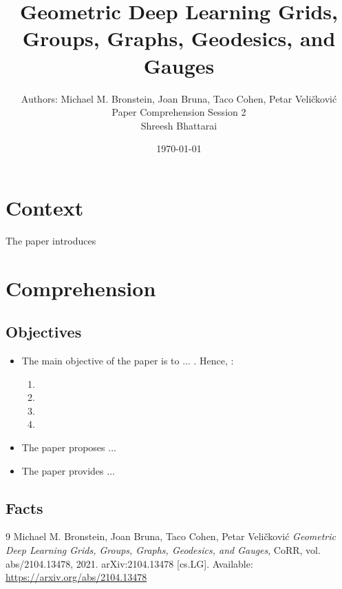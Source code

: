 \documentclass[11pt, a4paper]{article}
\title{Geometric Deep Learning Grids, Groups, Graphs, Geodesics, and Gauges}
\author{Authors: Michael M. Bronstein, Joan Bruna, Taco Cohen, Petar Veličković\\Paper Comprehension Session 2\\Shreesh Bhattarai}
\date{\today}
\theoremstyle{plain} %
\theoremstyle{definition} %
\begin{document}
	
	\maketitle
	
	\section{Context}
	\label{sec:context}
		The paper introduces 



	\section{Comprehension}
	\label{sec:comprehension}
		\subsection{Objectives}
		\label{sec:objectives}
			\begin{itemize}
				\item The main objective of the paper is to ... . Hence, :
				\begin{enumerate}
					\item
					\item
					\item
					\item
				\end{enumerate}
				\item The paper proposes ...
				\item The paper provides ...
			\end{itemize}


		\subsection{Facts}
		\label{sec:facts}
			
			
			
			
			
			
			
			
			
			
			

	\begin{thebibliography}{9}
		Michael M. Bronstein, Joan Bruna, Taco Cohen, Petar Veličković
		\textit{Geometric Deep Learning Grids, Groups, Graphs, Geodesics, and Gauges},
		CoRR, vol. abs/2104.13478, 2021.
		arXiv:2104.13478 [cs.LG].
		Available: \url{https://arxiv.org/abs/2104.13478}
	\end{thebibliography}
\end{document}
